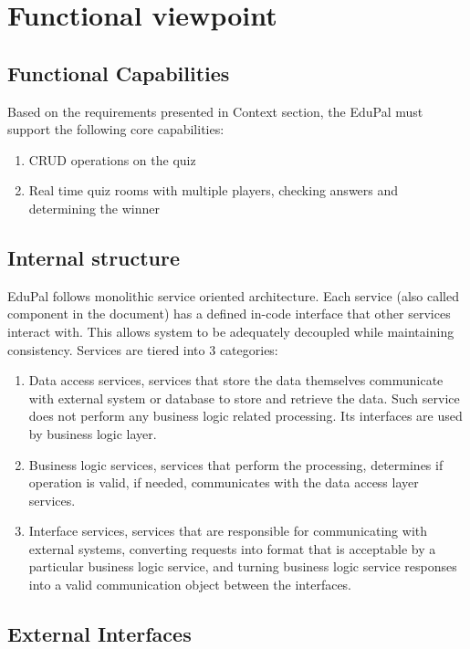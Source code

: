 \section{Functional viewpoint}

\subsection{Functional Capabilities}

Based on the requirements presented in Context section, the EduPal must support the following core capabilities:

\begin{enumerate}
  \item CRUD operations on the quiz
  \item Real time quiz rooms with multiple players, checking answers and determining the winner
\end{enumerate}

\subsection{Internal structure}

EduPal follows monolithic service oriented architecture. Each service (also called component in the document) has a defined in-code interface that other services interact with. This allows system to be adequately decoupled while maintaining consistency. Services are tiered into 3 categories:

\begin{enumerate}
  \item Data access services, services that store the data themselves communicate with external system or database to store and retrieve the data. Such service does not perform any business logic related processing. Its interfaces are used by business logic layer.
  \item Business logic services, services that perform the processing, determines if operation is valid, if needed, communicates with the data access layer services.
  \item Interface services, services that are responsible for communicating with external systems, converting requests into format that is acceptable by a particular business logic service, and turning business logic service responses into a valid communication object between the interfaces.
\end{enumerate}

\subsection{External Interfaces}

